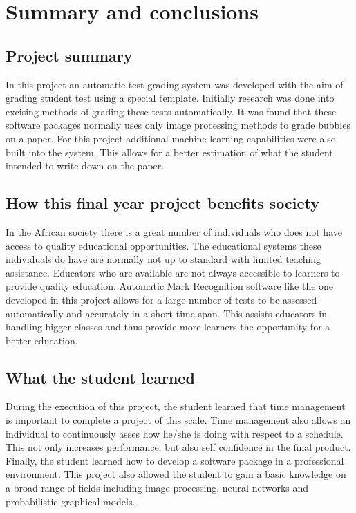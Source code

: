 \def\baselinestretch{1}
\chapter{Summary and conclusions}
\label{ch:Conclusions}

\graphicspath{{Conclusions/Figures_Conclusions/}}
\section{Project summary}

In this project an automatic test grading system was developed with the aim of grading student test using a special template. Initially research was done into excising methods of grading these tests automatically. It was found that these software packages normally uses only image processing methods to grade bubbles on a paper. For this project additional machine learning capabilities were also built into the system. This allows for a better estimation of what the student  intended to write down on the paper.

\section{How this final year project benefits society}
In the African society there is a great number of individuals who does not have access to quality educational opportunities. The educational systems these individuals do have are normally not up to standard with limited teaching assistance. Educators who are available are not always accessible to learners to provide quality education. Automatic Mark Recognition software like the one developed in this project allows for a large number of tests to be assessed automatically and accurately in a short time span. This assists educators in handling bigger classes and thus provide more learners the opportunity for a better education.

\section{What the student learned}
During the execution of this project, the student learned that time management is important to complete a project of this scale. Time management also allows an individual to continuously asses how he/she is doing with respect to a schedule. This not only increases performance, but also self confidence in the final product. Finally, the student learned how to develop a software package in a professional environment. This project also allowed the student to gain a basic knowledge on a broad range of fields including image processing, neural networks and probabilistic graphical models. 


